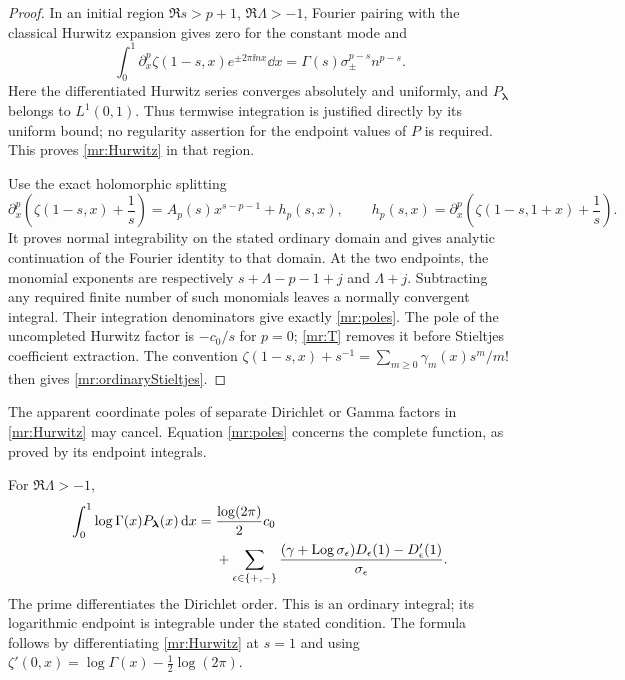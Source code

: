 \begin{proof}
In an initial region $\Re s>p+1$, $\Re\Lambda>-1$, Fourier pairing
with the classical Hurwitz expansion \cite[Eq.~25.11.9]{dlmf:hurwitz}
gives zero for the constant mode and
\[
 \int_0^1\partial_x^p\zeta(1-s,x)e^{\pm2\pi\ii nx}\dd x
       =\Gamma(s)\sigma_\pm^{p-s}n^{p-s}.
\]
Here the differentiated Hurwitz series converges absolutely and
uniformly, and $P_{\boldsymbol\lambda}$ belongs to $L^1(0,1)$.
Thus termwise integration is justified directly by its uniform bound;
no regularity assertion for the endpoint values of $P$ is required.
This proves \eqref{mr:Hurwitz} in that region.

Use the exact holomorphic splitting
\begin{equation}\label{mr:split}
 \partial_x^p\left(\zeta(1-s,x)+\frac1s\right)
      =A_p(s)x^{s-p-1}+h_p(s,x),\qquad
 h_p(s,x)=\partial_x^p\left(\zeta(1-s,1+x)+\frac1s\right).
\end{equation}
It proves normal integrability on the stated ordinary domain and gives
analytic continuation of the Fourier identity to that domain. At the
two endpoints, the monomial exponents are respectively
$s+\Lambda-p-1+j$ and $\Lambda+j$. Subtracting any required finite
number of such monomials leaves a normally convergent integral.
Their integration denominators give exactly \eqref{mr:poles}.
The pole of the uncompleted Hurwitz factor is $-c_0/s$ for $p=0$;
\eqref{mr:T} removes it before Stieltjes coefficient extraction.
The convention
$\zeta(1-s,x)+s^{-1}=\sum_{m\ge0}\gamma_m(x)s^m/m!$
then gives \eqref{mr:ordinaryStieltjes}.
\end{proof}

The apparent coordinate poles of separate Dirichlet or Gamma factors
in \eqref{mr:Hurwitz} may cancel. Equation \eqref{mr:poles} concerns
the complete function, as proved by its endpoint integrals.

\begin{corollary}
\label{mr:loggamma}
For $\Re\Lambda>-1$,
\begin{align}
 \int_0^1\log\Gamma(x)P_{\boldsymbol\lambda}(x)\,\mathrm d x
 ={}&\frac{\log(2\pi)}2c_0\notag\\
 &+\sum_{\epsilon\in\{+,-\}}
     \frac{(\gamma+\operatorname{Log}\sigma_\epsilon)D_\epsilon(1)
                                     -D_\epsilon'(1)}{\sigma_\epsilon}.
       \label{mr:logGamma}
\end{align}
The prime differentiates the Dirichlet order. This is an ordinary
integral; its logarithmic endpoint is integrable under the stated
condition. The formula follows by differentiating \eqref{mr:Hurwitz}
at $s=1$ and using
$\zeta'(0,x)=\log\Gamma(x)-\tfrac12\log(2\pi)$.
\end{corollary}

